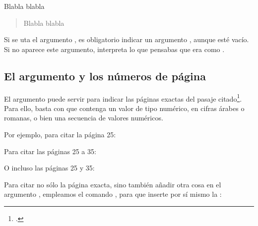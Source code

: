 \begin{latexcode}
Blabla \autocite[Véase también][que trata sobre un tema parecido.]{Saxer1980} blabla
\end{latexcode}

\begin{quotation}
Blabla \cite[Véase también][que trata sobre un tema parecido.]{Saxer1980} blabla
\end{quotation}

\begin{attention}
  Si se uta el argumento , es obligatorio indicar un
  argumento  , aunque esté vacío. Si no aparece este
  argumento,   interpreta lo que pensabas que era
   como .
\end{attention}

\subsection{El argumento  y los números de página}\label{pagespostnote}

El argumento  puede servir para indicar las páginas
exactas del pasaje citado\footcite[Para más detalles, consúltese:
][]{biblatex_pages}. Para ello, basta con que contenga un valor de
tipo numérico, en cifras árabes o romanas, o bien una secuencia de
valores numéricos.

Por ejemplo, para citar la página 25: 

\begin{latexcode}
\autocite[25]{Saxer1980}
\end{latexcode}

 Para citar las páginas 25 a 35:

\begin{latexcode}
\autocite[25-35]{Saxer1980}
\end{latexcode}

O incluso las páginas 25 y 35:

\begin{latexcode}
\autocite[25 \& 35]{Saxer1980}
\end{latexcode}

Para citar no sólo la página exacta, sino también añadir otra cosa en
el argumento , empleamos el comando  ,
para que  inserte por sí mismo la  :

\begin{latexcode}
\autocite[\pno~22,  con el que estamos en desacuerdo.]{Saxer1980}
\end{latexcode}


